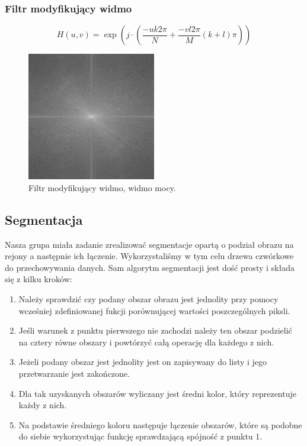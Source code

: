\documentclass{classrep}
\begin{document}
\subsubsection{Filtr modyfikujący widmo}

\begin{equation}
\label{eq:modyfikacja}
H(u,v) = \exp { \left( j \cdot \left( \frac{-u k 2 \pi}{N} + \frac{-v l 2 \pi }{M} \left( k + l  \right) \pi \right)\right) }
\end{equation}

\begin{figure}[H]
  \centering
  \includegraphics[width=0.5\textwidth]{img/lena_spectreMod}
  \caption{Filtr modyfikujący widmo, widmo mocy.}
  \label{fig_widmo_lena_spectreMod}
\end{figure}


\subsection{Segmentacja}
Nasza grupa miała zadanie zrealizować segmentacje opartą o podział obrazu na rejony a następnie ich łączenie. Wykorzystaliśmy w tym celu drzewa czwórkowe do przechowywania danych. Sam algorytm segmentacji jest dość prosty i składa się z kilku kroków:
\begin{enumerate}
\item Należy sprawdzić czy podany obszar obrazu jest jednolity przy pomocy wcześniej zdefiniowanej fukcji porównującej wartości poszczególnych piksli.
\item Jeśli warunek z punktu pierwszego nie zachodzi należy ten obszar podzielić na cztery równe obszary i powtórzyć całą operację dla każdego z nich.
\item Jeżeli podany obszar jest jednolity jest on zapisywany do listy i jego przetwarzanie jest zakończone.
\item Dla tak uzyskanych obszarów wyliczany jest średni kolor, który reprezentuje każdy z nich.
\item Na podstawie średniego koloru następuje łączenie obszarów, które są podobne do siebie wykorzystując funkcję sprawdzającą spójność z punktu 1.
\end{enumerate}
\end{document}

